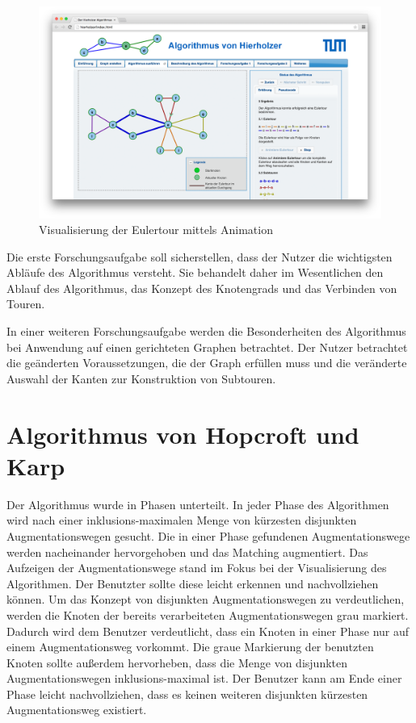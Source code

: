 \begin{figure}[h!]
	\centering
	\includegraphics[width=\textwidth]{figures/hierholzer_animation}
	\caption[Eulertour Animation]{Visualisierung der Eulertour mittels Animation}\label{fig:hierholzer-animation}
\end{figure}

Die erste Forschungsaufgabe soll sicherstellen, dass der Nutzer die wichtigsten Abläufe des Algorithmus versteht. Sie behandelt daher im Wesentlichen den Ablauf des Algorithmus, das Konzept des Knotengrads und das Verbinden von Touren.

In einer weiteren Forschungsaufgabe werden die Besonderheiten des Algorithmus bei Anwendung auf einen gerichteten Graphen betrachtet. Der Nutzer betrachtet die geänderten Voraussetzungen, die der Graph erfüllen muss und die veränderte Auswahl der Kanten zur Konstruktion von Subtouren.
     
\section{Algorithmus von Hopcroft und Karp}%
Der Algorithmus wurde in Phasen unterteilt. In jeder Phase des Algorithmen wird nach einer inklusions-maximalen Menge von kürzesten disjunkten Augmentationswegen gesucht. Die in einer Phase gefundenen Augmentationswege werden nacheinander hervorgehoben und das Matching augmentiert.
Das Aufzeigen der Augmentationswege stand im Fokus bei der Visualisierung des Algorithmen. Der Benutzter sollte diese leicht erkennen und nachvollziehen können. Um das Konzept von disjunkten Augmentationswegen zu verdeutlichen, werden die Knoten der bereits verarbeiteten Augmentationswegen grau markiert. Dadurch wird dem Benutzer verdeutlicht, dass ein Knoten in einer Phase nur auf einem Augmentationsweg vorkommt. 
Die graue Markierung der benutzten Knoten sollte außerdem hervorheben, dass die Menge von disjunkten Augmentationswegen inklusions-maximal ist. Der Benutzer kann am Ende einer Phase leicht nachvollziehen, dass es keinen weiteren disjunkten kürzesten Augmentationsweg existiert.


